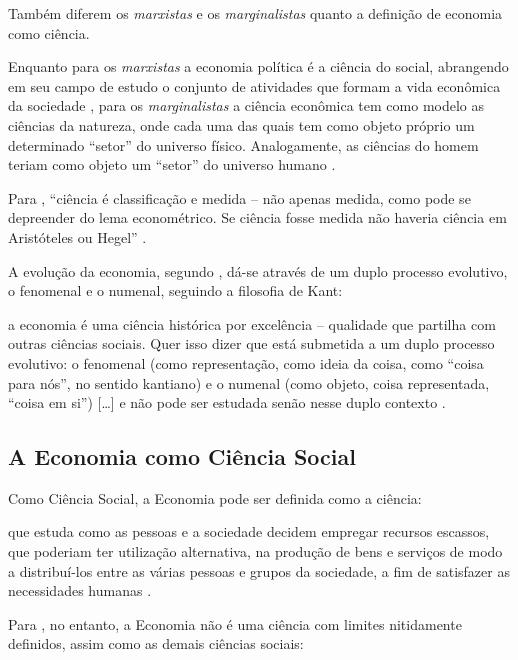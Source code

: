 \documentclass[
	10pt,				%
	openright,			%
	twoside,			%
	a5paper,			%
	english,			%
	french,				%
	spanish,			%
	brazil				%
	]{abntex2}
\renewenvironment{quote}
  {\small\list{}{\rightmargin=0.1cm \leftmargin=4cm}%
   \item\relax}
  {\endlist}
\begin{document}
Também diferem os \emph{marxistas} e os \emph{marginalistas} quanto a
definição de economia como ciência.

Enquanto para os \emph{marxistas} a economia política é a ciência do
social, abrangendo em seu campo de estudo o conjunto de atividades que
formam a vida econômica da sociedade \cite[p.~14]{singer}, para os
\emph{marginalistas} a ciência econômica tem como modelo as ciências da
natureza, onde cada uma das quais tem como objeto próprio um determinado
``setor'' do universo físico. Analogamente, as ciências do homem teriam
como objeto um ``setor'' do universo humano \cite[p.~15]{singer}.

Para , ``ciência é classificação e medida
-- não apenas medida, como pode se depreender do lema econométrico. Se
ciência fosse medida não haveria ciência em Aristóteles ou Hegel''
\cite[p.~204]{rangel1956}.

A evolução da economia, segundo , dá-se através
de um duplo processo evolutivo, o fenomenal e o numenal, seguindo a
filosofia de Kant:

\begin{quote}
a economia é uma ciência histórica por excelência -- qualidade que
partilha com outras ciências sociais. Quer isso dizer que está submetida
a um duplo processo evolutivo: o fenomenal (como representação, como
ideia da coisa, como ``coisa para nós'', no sentido kantiano) e o
numenal (como objeto, coisa representada, ``coisa em si'')
{[}\ldots{}{]} e não pode ser estudada senão nesse duplo contexto
\cite[p.~204]{rangel1956}.
\end{quote}

\subsection{A Economia como Ciência
Social}\label{a-economia-como-ciuxeancia-social}

Como Ciência Social, a Economia pode ser definida como a ciência:

\begin{quote}
que estuda como as pessoas e a sociedade decidem empregar recursos
escassos, que poderiam ter utilização alternativa, na produção de bens e
serviços de modo a distribuí-los entre as várias pessoas e grupos da
sociedade, a fim de satisfazer as necessidades humanas
\cite[p.~5]{passosnogami}.
\end{quote}

Para , no entanto, a Economia não é uma
ciência com limites nitidamente definidos, assim como as demais ciências
sociais:
\end{document}
